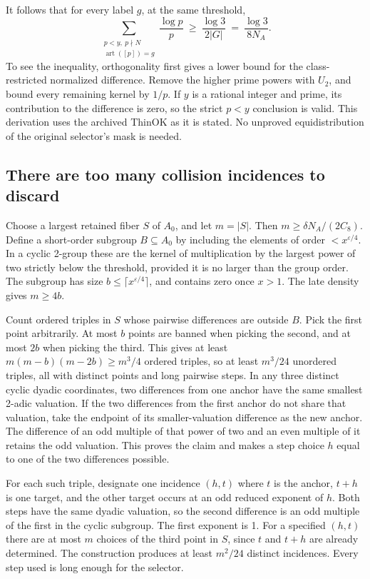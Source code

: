 \documentclass[12pt,letterpaper]{article}
\DeclareRobustCommand{\id}[1]{\mbox{\small\ttfamily #1}}
\begin{document}
It follows that for every label \(g\), at the same threshold,
\[
 \sum_{\substack{p<y,\ p\nmid N\\ \operatorname{art}([p])=g}}
                   \frac{\log p}{p}
     \ \ge\ \frac{\log3}{2|G|}
     \ =\ \frac{\log3}{8N_A}.
 \label{eq:class-weight}
\]
To see the inequality, orthogonality first gives a lower bound for the class-restricted normalized difference. Remove the higher prime powers with \(U_2\), and bound every remaining kernel by \(1/p\). If \(y\) is a rational integer and prime, its contribution to the difference is zero, so the strict \(p<y\) conclusion is valid. This derivation uses the archived \id{ThinOK} as it is stated. No unproved equidistribution of the original selector's mask is needed.

\subsection{There are too many collision incidences to discard}

Choose a largest retained fiber \(S\) of \(A_0\), and let \(m=|S|\). Then \(m\ge \delta N_A/(2C_8)\). Define a short-order subgroup \(B\subseteq A_0\) by including the elements of order \(<x^{\varepsilon/4}\). In a cyclic 2-group these are the kernel of multiplication by the largest power of two strictly below the threshold, provided it is no larger than the group order. The subgroup has size \(b\le\lceil x^{\varepsilon/4}\rceil\), and contains zero once \(x>1\). The late density gives \(m\ge4b\).

Count ordered triples in \(S\) whose pairwise differences are outside \(B\). Pick the first point arbitrarily. At most \(b\) points are banned when picking the second, and at most \(2b\) when picking the third. This gives at least \(m(m-b)(m-2b)\ge m^3/4\) ordered triples, so at least \(m^3/24\) unordered triples, all with distinct points and long pairwise steps. In any three distinct cyclic dyadic coordinates, two differences from one anchor have the same smallest 2-adic valuation. If the two differences from the first anchor do not share that valuation, take the endpoint of its smaller-valuation difference as the new anchor. The difference of an odd multiple of that power of two and an even multiple of it retains the odd valuation. This proves the claim and makes a step choice \(h\) equal to one of the two differences possible.

For each such triple, designate one incidence \((h,t)\) where \(t\) is the anchor, \(t+h\) is one target, and the other target occurs at an odd reduced exponent of \(h\). Both steps have the same dyadic valuation, so the second difference is an odd multiple of the first in the cyclic subgroup. The first exponent is 1. For a specified \((h,t)\) there are at most \(m\) choices of the third point in \(S\), since \(t\) and \(t+h\) are already determined. The construction produces at least \(m^2/24\) distinct incidences. Every step used is long enough for the selector.
\end{document}
